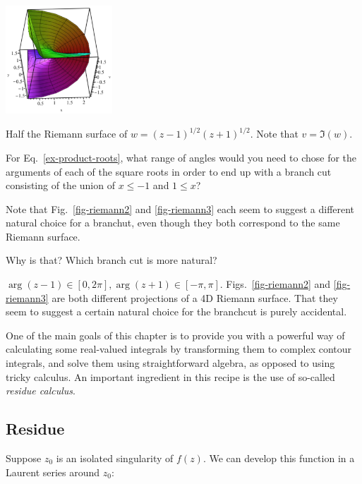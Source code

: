 \begin{exer}
\begin{marginfigure}[0.cm]
\centering
\includegraphics[width=4cm]{complex/figures/riemann3}
\caption{Half the Riemann surface of $w=(z-1)^{1/2}(z+1)^{1/2}$. Note that $v=\Im(w)$. }
\label{fig-riemann3}
\end{marginfigure}

For Eq.~\ref{ex-product-roots}, what range of angles would you need to chose for the arguments of each of the square roots in order to end up with a branch cut consisting of the union of  $x \le -1$ and $1 \le x$?


Note that Fig.~\ref{fig-riemann2} and \ref{fig-riemann3} each seem to suggest a different natural choice for a branchut, even though they both correspond to the same Riemann surface.


Why is that? Which branch cut is more natural?
  \begin{sol}
    $\arg(z-1) \in [0, 2 \pi], \arg(z+1) \in [-\pi,\pi]$. Figs.~\ref{fig-riemann2} and \ref{fig-riemann3} are both different projections of a 4D Riemann surface. That they seem to suggest a certain natural choice for the branchcut is purely accidental.
\end{sol}
\end{exer}

\pagebreak



One of the main goals of this chapter is to provide you with a powerful way of calculating some real-valued integrals by transforming them to complex contour integrals, and solve them using straightforward algebra, as opposed to using tricky calculus. An important ingredient in this recipe is the use of so-called \emph{residue calculus}.

\subsection*{Residue}

Suppose $z_0$ is an isolated singularity of $f(z)$. We can develop this function in a Laurent series around $z_0$:

